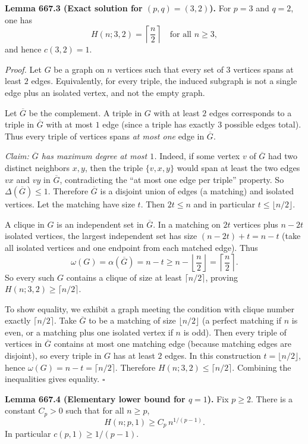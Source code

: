 \medskip
\noindent\textbf{Lemma 667.3 (Exact solution for $(p,q)=(3,2)$).}
For $p=3$ and $q=2$, one has
\[
H(n;3,2)=\left\lceil \frac{n}{2}\right\rceil \quad\text{for all } n\ge 3,
\]
and hence $c(3,2)=1$.

\noindent\emph{Proof.}
Let $G$ be a graph on $n$ vertices such that every set of $3$ vertices spans at least $2$ edges.
Equivalently, for every triple, the induced subgraph is not a single edge plus an isolated vertex, and not the empty graph.

Let $\overline{G}$ be the complement.
A triple in $G$ with at least $2$ edges corresponds to a triple in $\overline{G}$ with at most $1$ edge (since a triple has exactly $3$ possible edges total).
Thus every triple of vertices spans \emph{at most one} edge in $\overline{G}$.

\emph{Claim: $\overline{G}$ has maximum degree at most $1$.}
Indeed, if some vertex $v$ of $\overline{G}$ had two distinct neighbors $x,y$, then the triple $\{v,x,y\}$ would span at least the two edges $vx$ and $vy$ in $\overline{G}$, contradicting the ``at most one edge per triple'' property.
So $\Delta(\overline{G})\le 1$.
Therefore $\overline{G}$ is a disjoint union of edges (a matching) and isolated vertices.
Let the matching have size $t$.
Then $2t\le n$ and in particular $t\le \lfloor n/2\rfloor$.

A clique in $G$ is an independent set in $\overline{G}$. In a matching on $2t$ vertices plus $n-2t$ isolated vertices, the largest independent set has size $(n-2t)+t = n-t$ (take all isolated vertices and one endpoint from each matched edge).
Thus
\[
\omega(G)=\alpha(\overline{G})=n-t \ge n-\left\lfloor \frac{n}{2}\right\rfloor = \left\lceil \frac{n}{2}\right\rceil.
\]
So every such $G$ contains a clique of size at least $\lceil n/2\rceil$, proving
$H(n;3,2)\ge \lceil n/2\rceil$.

To show equality, we exhibit a graph meeting the condition with clique number exactly $\lceil n/2\rceil$.
Take $\overline{G}$ to be a matching of size $\lfloor n/2\rfloor$ (a perfect matching if $n$ is even, or a matching plus one isolated vertex if $n$ is odd).
Then every triple of vertices in $\overline{G}$ contains at most one matching edge (because matching edges are disjoint), so every triple in $G$ has at least $2$ edges.
In this construction $t=\lfloor n/2\rfloor$, hence $\omega(G)=n-t=\lceil n/2\rceil$.
Therefore $H(n;3,2)\le \lceil n/2\rceil$.
Combining the inequalities gives equality.
\hfill$\square$

\medskip
\noindent\textbf{Lemma 667.4 (Elementary lower bound for $q=1$).}
Fix $p\ge 2$.
There is a constant $C_p>0$ such that for all $n\ge p$,
\[
H(n;p,1) \ge C_p\, n^{1/(p-1)}.
\]
In particular $c(p,1)\ge 1/(p-1)$.

